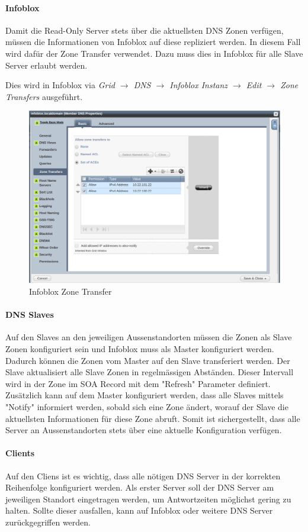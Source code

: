 \paragraph{Infoblox}

Damit die Read-Only Server stets über die aktuellsten DNS Zonen verfügen, müssen die Informationen von Infoblox auf diese repliziert werden. In diesem Fall wird dafür der Zone Transfer verwendet. Dazu muss dies in Infoblox für alle Slave Server erlaubt werden. 

Dies wird in Infoblox via \textit{Grid $\rightarrow$ DNS $\rightarrow$ Infoblox Instanz $\rightarrow$ Edit $\rightarrow$ Zone Transfers} ausgeführt.

\begin{figure}[H]
	\centering
	\includegraphics[width=0.8\linewidth]{img/Absicherung/Infoblox_Zone_Transfer.png}
	\caption{Infoblox Zone Transfer}
	\label{fig:Infoblox Zone Transfer}
\end{figure}

\paragraph{DNS Slaves}

Auf den Slaves an den jeweiligen Aussenstandorten müssen die Zonen als Slave Zonen konfiguriert sein und Infoblox muss als Master konfiguriert werden. Dadurch können die Zonen vom Master auf den Slave transferiert werden. Der Slave aktualisiert alle Slave Zonen in regelmässigen Abständen. Dieser Intervall wird in der Zone im SOA Record mit dem "Refresh" Parameter definiert.
Zusätzlich kann auf dem Master konfiguriert werden, dass alle Slaves mittels "Notify" informiert werden, sobald sich eine Zone ändert, worauf der Slave die aktuellsten Informationen für diese Zone abruft. Somit ist sichergestellt, dass alle Server an Aussenstandorten stets über eine aktuelle Konfiguration verfügen.

\paragraph{Clients}

Auf den Cliens ist es wichtig, dass alle nötigen DNS Server in der korrekten Reihenfolge konfiguriert werden. Als erster Server soll der DNS Server am jeweiligen Standort eingetragen werden, um Antwortzeiten möglichst gering zu halten. Sollte dieser ausfallen, kann auf Infoblox oder weitere DNS Server zurückgegriffen werden.